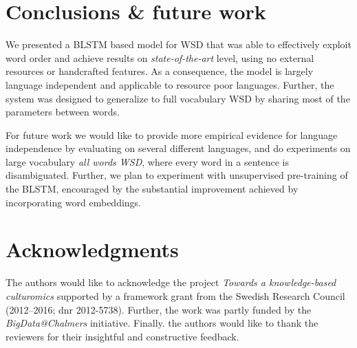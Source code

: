 \documentclass[11pt]{article}
\begin{document}
 \section{Conclusions \& future work}
We presented a BLSTM based model for WSD that was able to effectively exploit word order and achieve results on \emph{state-of-the-art} level, using no external resources or handcrafted features. 
As a consequence, the model is largely language independent and applicable to resource poor languages.
Further, the system was designed to generalize to full vocabulary WSD by sharing most of the parameters between words. 

For future work we would like to provide more empirical evidence for language independence by evaluating on several different languages, and do experiments on large vocabulary \emph{all words WSD}, where every word in a sentence is disambiguated. Further, we plan to experiment with unsupervised pre-training of the BLSTM, encouraged by the substantial improvement achieved by incorporating word embeddings.  


\section*{Acknowledgments}
The authors would like to acknowledge the project \emph{Towards a knowledge-based culturomics} supported by a framework grant from the Swedish Research Council (2012--2016; dnr 2012-5738). Further, the work was partly funded by the \emph{BigData@Chalmers} initiative. Finally. the authors would like to thank the reviewers for their insightful and constructive feedback.



\listoftodos
\end{document}
